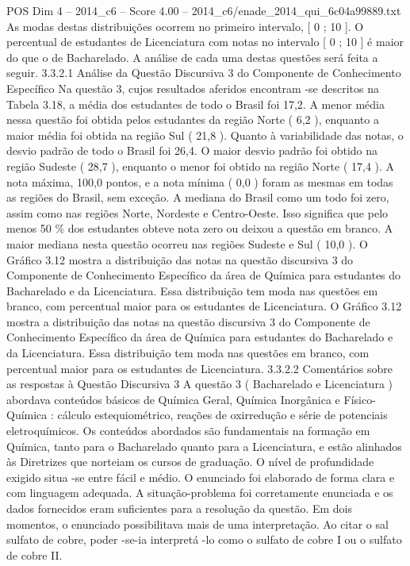 \begin{textsample}{POS Dim 4 – 2014\_c6 – Score 4.00 – 2014\_c6/enade\_2014\_qui\_6c04a99889.txt}
As modas destas distribuições ocorrem no primeiro intervalo, [ 0 ; 10 ].
O percentual de estudantes de Licenciatura com notas no intervalo [ 0 ; 10 ] é maior do que o de Bacharelado.
A análise de cada uma destas questões será feita a seguir. 3.3.2.1 Análise da Questão Discursiva 3 do Componente de Conhecimento Específico Na questão 3, cujos resultados aferidos encontram -se descritos na Tabela 3.18, a média dos estudantes de todo o Brasil foi 17,2.
A menor média nessa questão foi obtida pelos estudantes da região Norte ( 6,2 ), enquanto a maior média foi obtida na região Sul ( 21,8 ).
Quanto à variabilidade das notas, o desvio padrão de todo o Brasil foi 26,4.
O maior desvio padrão foi obtido na região Sudeste ( 28,7 ), enquanto o menor foi obtido na região Norte ( 17,4 ).
A nota máxima, 100,0 pontos, e a nota mínima ( 0,0 ) foram as mesmas em todas as regiões do Brasil, sem exceção.
A mediana do Brasil como um todo foi zero, assim como nas regiões Norte, Nordeste e Centro-Oeste.
Isso significa que pelo menos 50 \% dos estudantes obteve nota zero ou deixou a questão em branco.
A maior mediana nesta questão ocorreu nas regiões Sudeste e Sul ( 10,0 ).
O Gráfico 3.12 mostra a distribuição das notas na questão discursiva 3 do Componente de Conhecimento Específico da área de Química para estudantes do Bacharelado e da Licenciatura.
Essa distribuição tem moda nas questões em branco, com percentual maior para os estudantes de Licenciatura.
O Gráfico 3.12 mostra a distribuição das notas na questão discursiva 3 do Componente de Conhecimento Específico da área de Química para estudantes do Bacharelado e da Licenciatura.
Essa distribuição tem moda nas questões em branco, com percentual maior para os estudantes de Licenciatura. 3.3.2.2 Comentários sobre as respostas à Questão Discursiva 3 A questão 3 ( Bacharelado e Licenciatura ) abordava conteúdos básicos de Química Geral, Química Inorgânica e Físico-Química : cálculo estequiométrico, reações de oxirredução e série de potenciais eletroquímicos.
Os conteúdos abordados são fundamentais na formação em Química, tanto para o Bacharelado quanto para a Licenciatura, e estão alinhados às Diretrizes que norteiam os cursos de graduação.
O nível de profundidade exigido situa -se entre fácil e médio.
O enunciado foi elaborado de forma clara e com linguagem adequada.
A situação-problema foi corretamente enunciada e os dados fornecidos eram suficientes para a resolução da questão.
Em dois momentos, o enunciado possibilitava mais de uma interpretação.
Ao citar o sal sulfato de cobre, poder -se-ia interpretá -lo como o sulfato de cobre I ou o sulfato de cobre II.

\end{textsample}
